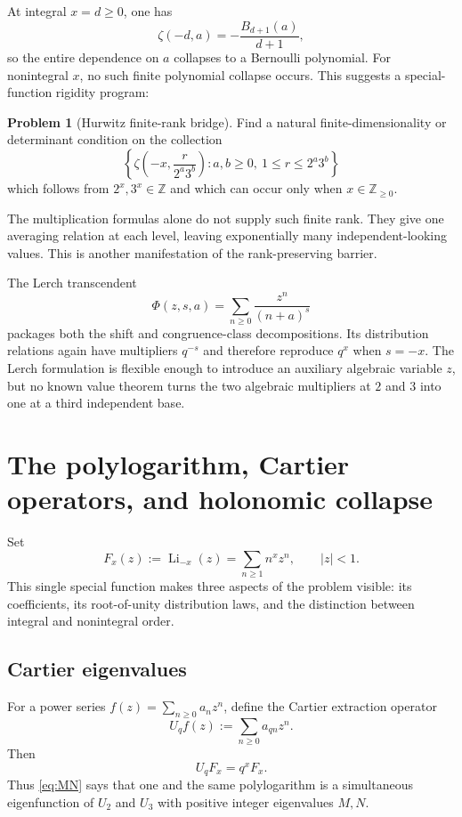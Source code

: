 \documentclass[11pt]{article}
\numberwithin{equation}{section}
\theoremstyle{definition}
\newtheorem{problem}[theorem]{Problem}
\theoremstyle{remark}
\newcommand{\Z}{\mathbb{Z}}
\newcommand{\Li}{\operatorname{Li}}
\begin{document}
At integral $x=d\ge0$, one has
\begin{equation}
 \zeta(-d,a)=-\frac{B_{d+1}(a)}{d+1},
 \label{eq:hurwitz-bernoulli}
\end{equation}
so the entire dependence on $a$ collapses to a Bernoulli polynomial.  For nonintegral $x$, no such finite polynomial collapse occurs.  This suggests a special-function rigidity program:

\begin{problem}[Hurwitz finite-rank bridge]
Find a natural finite-dimensionality or determinant condition on the collection
\[
 \left\{\zeta\!\left(-x,\frac{r}{2^a3^b}\right):a,b\ge0,\ 1\le r\le2^a3^b\right\}
\]
which follows from $2^x,3^x\in\Z$ and which can occur only when $x\in\Z_{\ge0}$.
\end{problem}

The multiplication formulas alone do not supply such finite rank.  They give one averaging relation at each level, leaving exponentially many independent-looking values.  This is another manifestation of the rank-preserving barrier.

The Lerch transcendent
\[
 \Phi(z,s,a)=\sum_{n\ge0}\frac{z^n}{(n+a)^s}
\]
packages both the shift and congruence-class decompositions.  Its distribution relations again have multipliers $q^{-s}$ and therefore reproduce $q^x$ when $s=-x$.  The Lerch formulation is flexible enough to introduce an auxiliary algebraic variable $z$, but no known value theorem turns the two algebraic multipliers at $2$ and $3$ into one at a third independent base.

\section{The polylogarithm, Cartier operators, and holonomic collapse}
\label{sec:polylog}

Set
\begin{equation}
 F_x(z):=\Li_{-x}(z)=\sum_{n\ge1}n^x z^n,\qquad |z|<1.
 \label{eq:Fx}
\end{equation}
This single special function makes three aspects of the problem visible: its coefficients, its root-of-unity distribution laws, and the distinction between integral and nonintegral order.

\subsection{Cartier eigenvalues}
For a power series $f(z)=\sum_{n\ge0}a_nz^n$, define the Cartier extraction operator
\begin{equation}
 U_qf(z):=\sum_{n\ge0}a_{qn}z^n.
 \label{eq:Uq}
\end{equation}
Then
\begin{equation}
 U_qF_x=q^xF_x.
 \label{eq:Cartier-eigen}
\end{equation}
Thus \eqref{eq:MN} says that one and the same polylogarithm is a simultaneous eigenfunction of $U_2$ and $U_3$ with positive integer eigenvalues $M,N$.
\end{document}
